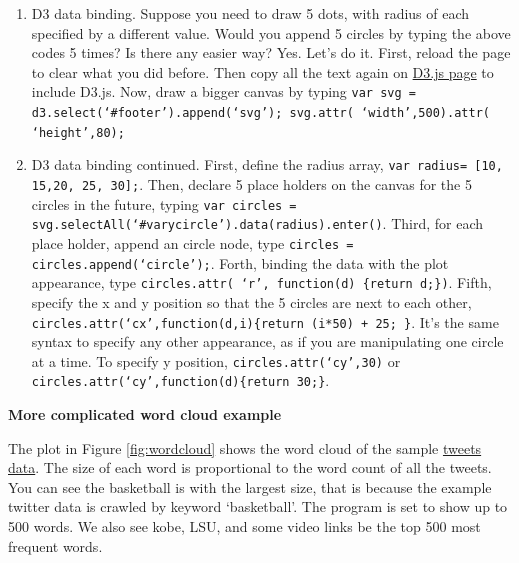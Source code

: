 \documentclass[a4paper, 11pt]{article}
\begin{document}
\begin{enumerate}
\item D3 data binding. Suppose you need to draw 5 dots, with radius of each specified by a different value. Would you append 5 circles by typing the above codes 5 times? Is there any easier way? Yes. Let's do it. First, reload the page to clear what you did before. Then copy all the text again on \href{https://raw.githubusercontent.com/mbostock/d3/master/d3.min.js}{D3.js page} to include D3.js. Now, draw a bigger canvas by typing \texttt{var svg = d3.select(`\#{footer}').append(`svg'); svg.attr( `width',500).attr( `height',80);} 
\item D3 data binding continued. First, define the radius array, \texttt{var radius= [10, 15,20, 25, 30];}. Then, declare 5 place holders on the canvas for the 5 circles in the future, typing \texttt{var circles = svg.selectAll(`\#{varycircle}').data(radius).enter()}. Third, for each place holder, append an circle node, type \texttt{circles = circles.append(`circle');}. Forth, binding the data with the plot appearance, type \texttt{circles.attr( `r', function(d) \{return d;\})}. Fifth, specify the x and y position so that the 5 circles are next to each other, \texttt{circles.attr(`cx',function(d,i)\{return (i*50) + 25; \}}. It's the same syntax to specify any other appearance, as if you are manipulating one circle at a time. To specify y position, \texttt{circles.attr(`cy',30)} or \texttt{circles.attr(`cy',function(d)\{return 30;\}}. 



\end{enumerate}
\textbf{More complicated word cloud example}

The plot in Figure \ref{fig:wordcloud} shows the word cloud of the sample \href{http://nymph332088.github.io/CIS4340/labassignments/Lab2/twitter_data.txt}{tweets data}. The size of each word is proportional to the word count of all the tweets. You can see the basketball is with the largest size, that is because the example twitter data is crawled by keyword `basketball'. The program is set to show up to 500 words. We also see kobe, LSU, and some video links be the top 500 most frequent words. 
\end{document}
